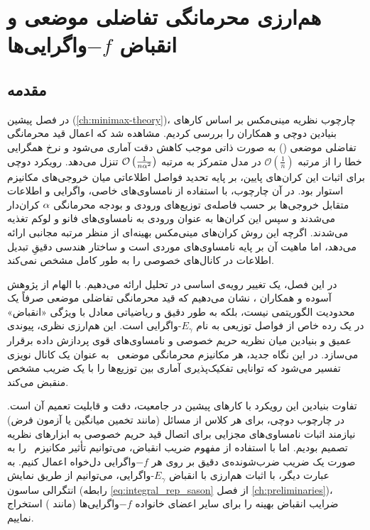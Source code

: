 \chapter{هم‌ارزی محرمانگی تفاضلی موضعی و انقباض $-f$واگرایی‌ها}
\label{ch:ldp-contraction}

\section{مقدمه}
\label{sec:ldp-contraction:intro}

در فصل پیشین (\ref{ch:minimax-theory})، چارچوب نظریه مینی‌مکس بر اساس کارهای بنیادین دوچی و همکاران \cite{duchi2018} را بررسی کردیم. مشاهده شد که اعمال قید محرمانگی تفاضلی موضعی () به صورت ذاتی موجب کاهش دقت آماری می‌شود و نرخ همگرایی خطا را از مرتبه $\mathcal{O}\left( \frac{1}{n} \right)$ در مدل متمرکز به مرتبه $\mathcal{O}\left( \frac{1}{n\alpha^2} \right)$ تنزل می‌دهد. رویکرد دوچی برای اثبات این کران‌های پایین، بر پایه تحدید فواصل اطلاعاتی میان خروجی‌های مکانیزم \mech\ استوار بود. در آن چارچوب، با استفاده از نامساوی‌های خاصی، واگرایی  و اطلاعات متقابل خروجی‌ها بر حسب فاصله‌ی  توزیع‌های ورودی و بودجه محرمانگی $\alpha$ کران‌دار می‌شدند و سپس این کران‌ها به عنوان ورودی به نامساوی‌های فانو و لوکم تغذیه می‌شدند. اگرچه این روش کران‌های مینی‌مکس بهینه‌ای از منظر مرتبه مجانبی ارائه می‌دهد، اما ماهیت آن بر پایه نامساوی‌های موردی است و ساختار هندسی دقیقِ تبدیل اطلاعات در کانال‌های خصوصی را به طور کامل مشخص نمی‌کند. 

در این فصل، یک تغییر رویه‌ی اساسی در تحلیل  ارائه می‌دهیم. با الهام از پژوهش آسوده و همکاران \cite{Asoodeh2021}، نشان می‌دهیم که قید محرمانگی تفاضلی موضعی صرفاً یک محدودیت الگوریتمی نیست، بلکه به طور دقیق و ریاضیاتی معادل با ویژگی «انقباض» در یک رده خاص از فواصل توزیعی به نام $E_\gamma$-واگرایی است. این هم‌ارزی نظری، پیوندی عمیق و بنیادین میان نظریه حریم خصوصی و نامساوی‌های قوی پردازش داده برقرار می‌سازد. در این نگاه جدید، هر مکانیزم محرمانگی موضعی \mech\ به عنوان یک کانال نویزی تفسیر می‌شود که توانایی تفکیک‌پذیری آماری بین توزیع‌ها را با یک ضریب مشخص منقبض می‌کند.

تفاوت بنیادین این رویکرد با کارهای پیشین در جامعیت، دقت و قابلیت تعمیم آن است. در چارچوب دوچی، برای هر کلاس از مسائل (مانند تخمین میانگین یا آزمون فرض) نیازمند اثبات نامساوی‌های مجزایی برای اتصال قید حریم خصوصی به ابزارهای نظریه تصمیم بودیم. اما با استفاده از مفهوم ضریب انقباض، می‌توانیم تأثیر مکانیزم \mech\ را به صورت یک ضریب ضرب‌شونده‌ی دقیق بر روی هر $-f$واگرایی دل‌خواه اعمال کنیم. به عبارت دیگر، با اثبات هم‌ارزی  با انقباض $E_\gamma$-واگرایی، می‌توانیم از طریق نمایش انتگرالی ساسون (رابطه \ref{eq:integral_rep_sason} از فصل \ref{ch:preliminaries})، ضرایب انقباض بهینه را برای سایر اعضای خانواده $-f$واگرایی‌ها (مانند ) استخراج نماییم.

